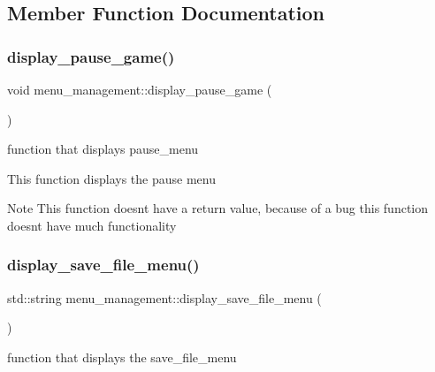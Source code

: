 \subsection{Member Function Documentation}
\mbox{\label{classmenu__management_ab7aa6674e3428604073af06efe5aa791}} 
\subsubsection{\texorpdfstring{display\+\_\+pause\+\_\+game()}{display\_pause\_game()}}
{\footnotesize\ttfamily void menu\+\_\+management\+::display\+\_\+pause\+\_\+game (\begin{DoxyParamCaption}{ }\end{DoxyParamCaption})}



function that displays pause\+\_\+menu 

This function displays the pause menu

\begin{DoxyNote}{Note}
This function doesn\textquotesingle{}t have a return value, because of a bug this function doesn\textquotesingle{}t have much functionality 
\end{DoxyNote}
\mbox{\label{classmenu__management_ac64c1eace3d955be8623a1129597dc54}} 
\subsubsection{\texorpdfstring{display\+\_\+save\+\_\+file\+\_\+menu()}{display\_save\_file\_menu()}}
{\footnotesize\ttfamily std\+::string menu\+\_\+management\+::display\+\_\+save\+\_\+file\+\_\+menu (\begin{DoxyParamCaption}{ }\end{DoxyParamCaption})}



function that displays the save\+\_\+file\+\_\+menu 

